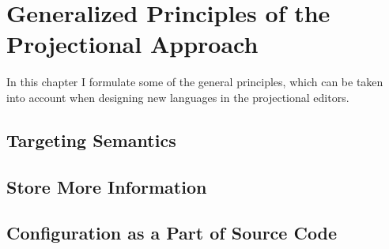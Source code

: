 \chapter{Generalized Principles of the Projectional Approach}
\label{chapter:genprinciples}

In this chapter I formulate some of the general principles, which can be taken into
account when designing new languages in the projectional editors.

\section{Targeting Semantics}

\section{Store More Information}


\section{Configuration as a Part of Source Code}


